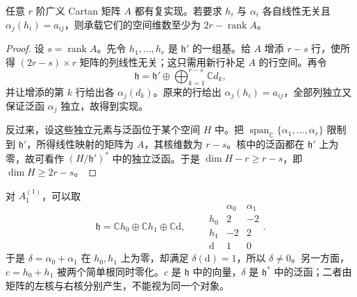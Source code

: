 \begin{proposition}\label{b5:prop:G-realization-exists}
	任意 \(r\) 阶广义 Cartan 矩阵 \(A\) 都有复实现。若要求 \(h_i\) 与 \(\alpha_i\) 各自线性无关且 \(\alpha_j(h_i)=a_{ij}\)，则承载它们的空间维数至少为 \(2r-\operatorname{rank}A\)。
\end{proposition}
\begin{proof}
	设 \(s=\operatorname{rank}A\)。先令 \(h_1,\ldots,h_r\) 是 \(\mathfrak h'\) 的一组基。给 \(A\) 增添 \(r-s\) 行，使所得 \((2r-s)\times r\) 矩阵的列线性无关；这只需用新行补足 \(A\) 的行空间。再令
	\[
		\mathfrak h=\mathfrak h'\oplus\bigoplus_{k=1}^{r-s}\mathbb Cd_k,
	\]
	并让增添的第 \(k\) 行给出各 \(\alpha_j(d_k)\)。原来的行给出 \(\alpha_j(h_i)=a_{ij}\)，全部列独立又保证泛函 \(\alpha_j\) 独立，故得到实现。

	反过来，设这些独立元素与泛函位于某个空间 \(H\) 中。把 \(\operatorname{span}_{\mathbb C}\{\alpha_1,\ldots,\alpha_r\}\) 限制到 \(\mathfrak h'\)，所得线性映射的矩阵为 \(A\)，其核维数为 \(r-s\)。核中的泛函都在 \(\mathfrak h'\) 上为零，故可看作 \((H/\mathfrak h')^*\) 中的独立泛函。于是 \(\dim H-r\ge r-s\)，即 \(\dim H\ge2r-s\)。
\end{proof}

对 \(A_1^{(1)}\)，可以取
\[
	\mathfrak h=\mathbb Ch_0\oplus\mathbb Ch_1\oplus\mathbb C\mathrm d,
	\qquad
	\begin{array}{c|rr}
		&\alpha_0&\alpha_1\\\hline
		h_0&2&-2\\
		h_1&-2&2\\
		\mathrm d&1&0
	\end{array}.
\]
于是 \(\delta=\alpha_0+\alpha_1\) 在 \(h_0,h_1\) 上为零，却满足 \(\delta(\mathrm d)=1\)，所以 \(\delta\ne0\)。另一方面，\(c=h_0+h_1\) 被两个简单根同时零化。\(c\) 是 \(\mathfrak h\) 中的向量，\(\delta\) 是 \(\mathfrak h^*\) 中的泛函；二者由矩阵的左核与右核分别产生，不能视为同一个对象。

